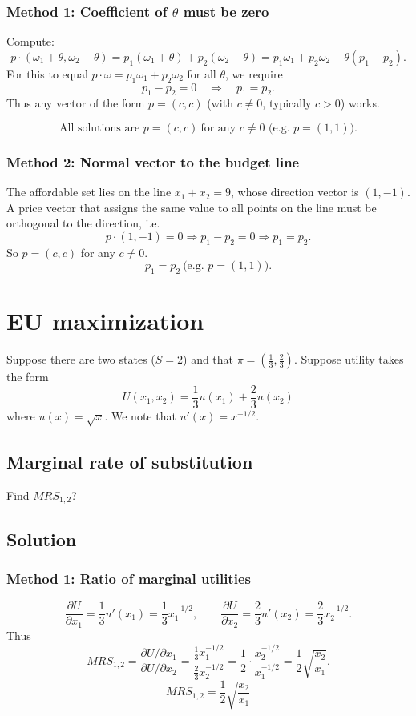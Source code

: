 \documentclass[12pt]{article}
\newcommand{\dotp}{\cdot}
\begin{document}
\subsubsection*{Method 1: Coefficient of \(\theta\) must be zero}
Compute:
\[
p\dotp(\omega_1+\theta,\omega_2-\theta)=p_1(\omega_1+\theta)+p_2(\omega_2-\theta)
=p_1\omega_1+p_2\omega_2+\theta(p_1-p_2).
\]
For this to equal \(p\dotp\omega=p_1\omega_1+p_2\omega_2\) for all \(\theta\), we require
\[
p_1-p_2=0\quad\Rightarrow\quad p_1=p_2.
\]
Thus any vector of the form \(p=(c,c)\) (with \(c\neq 0\), typically \(c>0\)) works.

\[
\boxed{\;\text{All solutions are }p=(c,c)\ \text{for any }c\neq 0\text{ (e.g. }p=(1,1)).\;}
\]

\subsubsection*{Method 2: Normal vector to the budget line}
The affordable set lies on the line \(x_1+x_2=9\), whose direction vector is \((1,-1)\).
A price vector that assigns the same value to all points on the line must be orthogonal to the direction, i.e.
\[
p\dotp(1,-1)=0\Rightarrow p_1-p_2=0\Rightarrow p_1=p_2.
\]
So \(p=(c,c)\) for any \(c\neq 0\).
\[
\boxed{\;p_1=p_2\ \text{(e.g. }p=(1,1)\text{).}\;}
\]

\newpage
\section{EU maximization}

Suppose there are two states (\(S=2\)) and that \(\pi=\left(\frac13,\frac23\right)\). Suppose utility takes the form
\[
U(x_1,x_2)=\frac13u(x_1)+\frac23u(x_2)
\]
where \(u(x)=\sqrt{x}\). We note that \(u'(x)=x^{-1/2}\).

\subsection{Marginal rate of substitution}
Find \(MRS_{1,2}\)?

\subsection*{Solution}
\subsubsection*{Method 1: Ratio of marginal utilities}
\[
\frac{\partial U}{\partial x_1}=\frac13 u'(x_1)=\frac13 x_1^{-1/2},\qquad
\frac{\partial U}{\partial x_2}=\frac23 u'(x_2)=\frac23 x_2^{-1/2}.
\]
Thus
\[
MRS_{1,2}=\frac{\partial U/\partial x_1}{\partial U/\partial x_2}
=\frac{\frac13 x_1^{-1/2}}{\frac23 x_2^{-1/2}}
=\frac12\cdot \frac{x_2^{-1/2}}{x_1^{-1/2}}
=\frac12\sqrt{\frac{x_2}{x_1}}.
\]
\[
\boxed{\;MRS_{1,2}=\frac12\sqrt{\frac{x_2}{x_1}}\;}
\]
\end{document}
